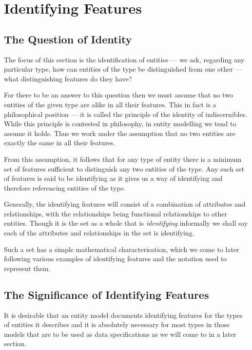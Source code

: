 \section{Identifying Features}
\label{IdentifyingFeatures}
\subsection{The Question of Identity}
\mynote
The focus of this section is the identification of entities ---  we ask, regarding any particular type, how can entities of the type be distinguished from one other 
--- what distinguishing features do they have? 

For there to be an answer to this question then we must assume that no two entities of the given type are alike in all their features. This in fact  is a philosophical position 
--- it is called the principle of the identity of indiscernibles. 
While this principle is contested in philosophy, in entity modelling we tend to assume it holds.
Thus we work under the assumption that no two entities are exactly the same in all their features. 

From this assumption, it follows that for any type of entity there is a minimum set of features sufficient to distinguish any two entities of the type. Any such set of features is said to be identifying as it gives us a way of identifying and therefore referencing entities of the type. 

 Generally, 
 the identifying features will consist of a combination of attributes and relationships, 
 with the relationships being functional relationships to other entities. 
Though it is the set as a whole that is \textit{identifying} 
informally we shall say each of the attributes and relationships in the set is identifying. 

Such a set has a simple mathematical characterisation, which we come to later following various
examples  of identifying features and the notation used to represent them.

\subsection{The Significance of Identifying Features}

\mynote 
It is desirable that an entity model documents identifying features for the types of entities it describes and  it is  absolutely necessary for most types in those models that are to be used as data specifications as we will come to in a later section. 

